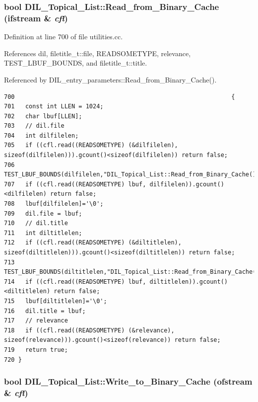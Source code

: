 \subsubsection{\setlength{\rightskip}{0pt plus 5cm}bool DIL\_\-Topical\_\-List::Read\_\-from\_\-Binary\_\-Cache (ifstream \& {\em cfl})}\label{classDIL__Topical__List_a4}




Definition at line 700 of file utilities.cc.

References dil, filetitle\_\-t::file, READSOMETYPE, relevance, TEST\_\-LBUF\_\-BOUNDS, and filetitle\_\-t::title.

Referenced by DIL\_\-entry\_\-parameters::Read\_\-from\_\-Binary\_\-Cache().



\footnotesize\begin{verbatim}700                                                             {
701   const int LLEN = 1024;
702   char lbuf[LLEN];
703   // dil.file
704   int dilfilelen;
705   if ((cfl.read((READSOMETYPE) (&dilfilelen), sizeof(dilfilelen))).gcount()<sizeof(dilfilelen)) return false;
706   TEST_LBUF_BOUNDS(dilfilelen,"DIL_Topical_List::Read_from_Binary_Cache()")
707   if ((cfl.read((READSOMETYPE) lbuf, dilfilelen)).gcount()<dilfilelen) return false;
708   lbuf[dilfilelen]='\0';
709   dil.file = lbuf;
710   // dil.title
711   int diltitlelen;
712   if ((cfl.read((READSOMETYPE) (&diltitlelen), sizeof(diltitlelen))).gcount()<sizeof(diltitlelen)) return false;
713   TEST_LBUF_BOUNDS(diltitlelen,"DIL_Topical_List::Read_from_Binary_Cache()")
714   if ((cfl.read((READSOMETYPE) lbuf, diltitlelen)).gcount()<diltitlelen) return false;
715   lbuf[diltitlelen]='\0';
716   dil.title = lbuf;
717   // relevance
718   if ((cfl.read((READSOMETYPE) (&relevance), sizeof(relevance))).gcount()<sizeof(relevance)) return false;
719   return true;
720 }
\end{verbatim}\normalsize 
{}
\subsubsection{\setlength{\rightskip}{0pt plus 5cm}bool DIL\_\-Topical\_\-List::Write\_\-to\_\-Binary\_\-Cache (ofstream \& {\em cfl})}\label{classDIL__Topical__List_a3}




